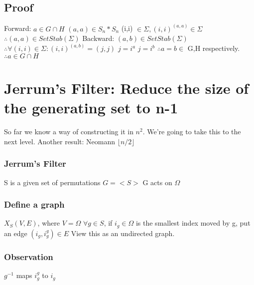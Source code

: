\subsection{Proof}
Forward:\newline
	$a \in G \cap H$\newline
	$(a,a) \in S_n*S_n$\newline
	(i,i) $\in \Sigma, (i,i)^{(a,a) } \in \Sigma$\newline
	$\therefore (a,a) \in SetStab(\Sigma)$\newline\newline
Backward:\newline
	$(a,b) \in SetStab(\Sigma)$\newline
	$\therefore \forall (i,i) \in \Sigma:(i,i)^{(a,b)}=(j,j)$\newline
	$j=i^a$\newline
	$j=i^b$\newline
	$\therefore a=b \in$ G,H respectively.\newline
	$\therefore a \in G \cap H$\newline


\section{Jerrum's Filter: Reduce the size of the generating set to n-1}
So far we know a way of constructing it in $n^2$. We're going to take this to the next level.
Another result: Neomann $ \lfloor n/2 \rfloor $

\subsubsection{Jerrum's Filter}
S is a given set of permutations\newline
$G = <S>$\newline
G acts on $\Omega$

\subsubsection{Define a graph}
$X_S (V,E)$, where $V=\Omega$\newline
$\forall g \in S$, if $i_g \in \Omega$  is the smallest index moved by g, put an edge $(i_g,i_g^g ) \in E$\newline
View this as an undirected graph.

\subsubsection{Observation}
$g^{-1}$  maps $i_g^g$  to $i_g$

